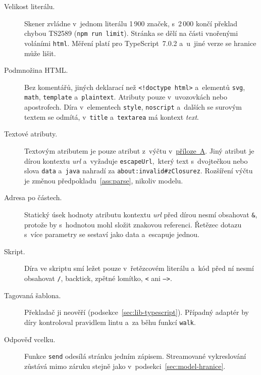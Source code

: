 \begin{description}
    \item[Velikost literálu.] Skener zvládne v~jednom literálu 1\,900 značek, s~2\,000 končí překlad chybou TS2589 (\texttt{npm run limit}). Stránka se dělí na části vnořenými voláními \texttt{html}. Měření platí pro TypeScript~7.0.2 a~u~jiné verze se hranice může lišit.
    \item[Podmnožina HTML.] Bez komentářů, jiných deklarací než \texttt{<!doctype html>} a~elementů \texttt{svg}, \texttt{math}, \texttt{template} a~\texttt{plaintext}. Atributy pouze v~uvozovkách nebo apostrofech. Díra v~elementech \texttt{style}, \texttt{noscript} a~dalších se surovým textem se odmítá, v~\texttt{title} a~\texttt{textarea} má kontext \emph{text}.
    \item[Textové atributy.] Textovým atributem je pouze atribut z~výčtu v~\hyperref[app:own-work]{příloze~A}. Jiný atribut je dírou kontextu \emph{url} a~vyžaduje \texttt{escapeUrl},~který text s~dvojtečkou nebo slova \texttt{data} a~\texttt{java} nahradí za \texttt{about:invalid\#zClosurez}. Rozšíření výčtu je změnou předpokladu~\ref{ass:parse}, nikoliv modelu.
    \item[Adresa po částech.] Statický úsek hodnoty atributu kontextu \emph{url} před dírou nesmí obsahovat \texttt{\&}, protože by s~hodnotou mohl složit znakovou referenci. Řetězec dotazu s~více parametry se sestaví jako data a~escapuje jednou.
    \item[Skript.] Díra ve skriptu smí ležet pouze v~řetězcovém literálu a~kód před ní nesmí obsahovat \texttt{/}, backtick, zpětné lomítko, \texttt{<} ani \texttt{-->}.
    \item[Tagovaná šablona.] Překladač ji neověří (podsekce~\ref{sec:lib-typescript}). Případný adaptér by díry kontroloval pravidlem lintu a~za běhu funkcí \texttt{walk}.
    \item[Odpověď vcelku.] Funkce \texttt{send} odesílá stránku jedním zápisem. Streamované vykreslování zůstává mimo záruku stejně jako v~podsekci~\ref{sec:model-hranice}.
\end{description}
